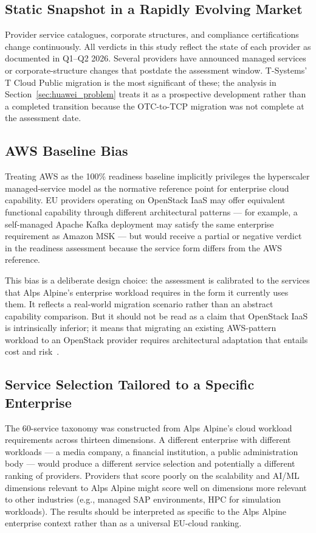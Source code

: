 \subsection{Static Snapshot in a Rapidly Evolving Market}

Provider service catalogues, corporate structures, and compliance certifications change continuously. All verdicts in this study reflect the state of each provider as documented in Q1--Q2 2026. Several providers have announced managed services or corporate-structure changes that postdate the assessment window. T-Systems' T Cloud Public migration is the most significant of these; the analysis in Section~\ref{sec:huawei_problem} treats it as a prospective development rather than a completed transition because the OTC-to-TCP migration was not complete at the assessment date.

\subsection{AWS Baseline Bias}

Treating AWS as the 100\% readiness baseline implicitly privileges the hyperscaler managed-service model as the normative reference point for enterprise cloud capability. EU providers operating on OpenStack IaaS may offer equivalent functional capability through different architectural patterns — for example, a self-managed Apache Kafka deployment may satisfy the same enterprise requirement as Amazon MSK — but would receive a partial or negative verdict in the readiness assessment because the service form differs from the AWS reference.

This bias is a deliberate design choice: the assessment is calibrated to the services that Alps Alpine's enterprise workload requires in the form it currently uses them. It reflects a real-world migration scenario rather than an abstract capability comparison. But it should not be read as a claim that OpenStack IaaS is intrinsically inferior; it means that migrating an existing AWS-pattern workload to an OpenStack provider requires architectural adaptation that entails cost and risk~\cite{armbrust2010view}.

\subsection{Service Selection Tailored to a Specific Enterprise}

The 60-service taxonomy was constructed from Alps Alpine's cloud workload requirements across thirteen dimensions. A different enterprise with different workloads — a media company, a financial institution, a public administration body — would produce a different service selection and potentially a different ranking of providers. Providers that score poorly on the scalability and AI/ML dimensions relevant to Alps Alpine might score well on dimensions more relevant to other industries (e.g., managed SAP environments, HPC for simulation workloads). The results should be interpreted as specific to the Alps Alpine enterprise context rather than as a universal EU-cloud ranking.

